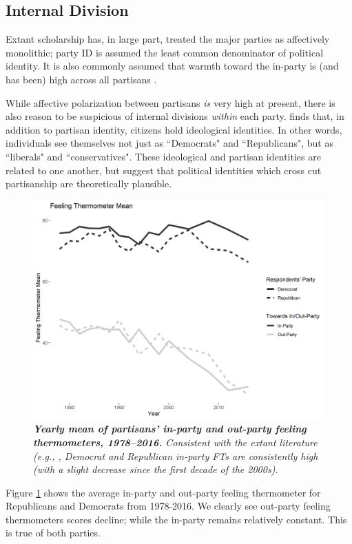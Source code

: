\documentclass[12pt]{article}
\begin{document}
\subsection{Internal Division}
Extant scholarship has, in large part, treated the major parties as affectively monolithic; party ID is assumed the least common denominator of political identity. It is also commonly assumed that warmth toward the in-party is (and has been) high across all partisans \citep{iyengar2012affect}. 


 While affective polarization between partisans \textit{is} very high at present, there is also reason to be suspicious of internal divisions \textit{within} each party. \cite{mason2018ideologues} finds that, in addition to partisan identity, citizens hold ideological identities. In other words, individuals see themselves not just as ``Democrats" and ``Republicans", but as ``liberals" and ``conservatives". These  ideological and partisan identities are related to one another, but suggest that political identities which cross cut partisanship are theoretically plausible.

\begin{figure}[H]
\center\includegraphics[width=5in]{cdf-avg.png}
\caption{\label{fig:cdf-avg}\textit{\textbf{Yearly mean of partisans' in-party and out-party feeling thermometers, 1978--2016.} Consistent with the extant literature (e.g., \citet{iyengar2012affect}, Democrat and Republican in-party FTs are consistently high (with a slight decrease since the first decade of the 2000s).}}
\end{figure}
\noindent Figure \ref{fig:cdf-avg} shows the average in-party and out-party feeling thermometer for Republicans and Democrats from 1978-2016. We clearly see out-party feeling thermometers scores decline; while the in-party remains relatively constant. This is true of both parties.
\end{document}
